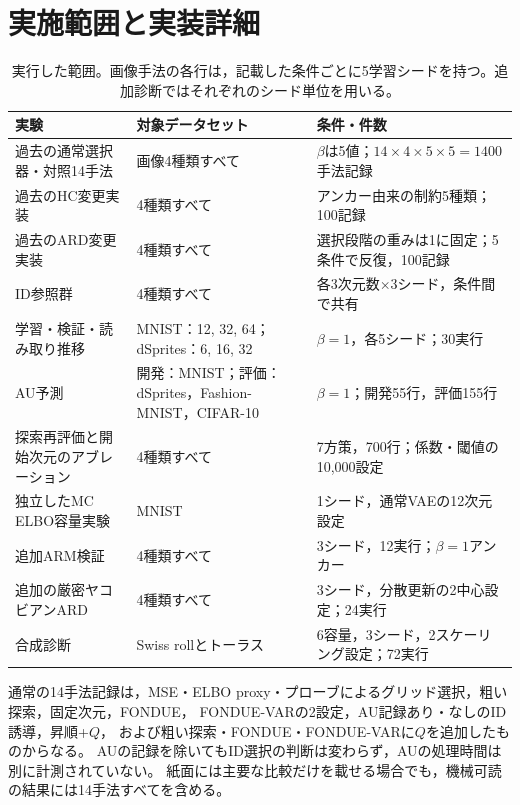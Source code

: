 \documentclass[11pt,a4paper]{ltjsarticle}
\begin{document}
\section{実施範囲と実装詳細}\label{app:coverage}
\begin{table}[H]
\caption{実行した範囲。画像手法の各行は，記載した条件ごとに5学習シードを持つ。追加診断ではそれぞれのシード単位を用いる。}
\label{tab:coverage}\small
\begin{tabularx}{\textwidth}{>{\raggedright\arraybackslash}p{}>{\raggedright\arraybackslash}p{}>{\raggedright\arraybackslash}X}\toprule
実験 & 対象データセット & 条件・件数 \\\midrule
過去の通常選択器・対照14手法 & 画像4種類すべて & $\beta$は5値；$14\times4\times5\times5=1400$手法記録 \\
過去のHC変更実装 & 4種類すべて & アンカー由来の制約5種類；100記録 \\
過去のARD変更実装 & 4種類すべて & 選択段階の重みは1に固定；5条件で反復，100記録 \\
ID参照群 & 4種類すべて & 各3次元数$\times$3シード，条件間で共有 \\
学習・検証・読み取り推移 & MNIST：12, 32, 64；dSprites：6, 16, 32 & $\beta=1$，各5シード；30実行 \\
AU予測 & 開発：MNIST；評価：dSprites，Fashion-MNIST，CIFAR-10 & $\beta=1$；開発55行，評価155行 \\
探索再評価と開始次元のアブレーション & 4種類すべて & 7方策，700行；係数・閾値の10,000設定 \\
独立したMC ELBO容量実験 & MNIST & 1シード，通常VAEの12次元設定 \\
追加ARM検証 & 4種類すべて & 3シード，12実行；$\beta=1$アンカー \\
追加の厳密ヤコビアンARD & 4種類すべて & 3シード，分散更新の2中心設定；24実行 \\
合成診断 & Swiss rollとトーラス & 6容量，3シード，2スケーリング設定；72実行 \\
\bottomrule\end{tabularx}
\end{table}

通常の14手法記録は，MSE・ELBO proxy・プローブによるグリッド選択，粗い探索，固定次元，FONDUE，
FONDUE-VARの2設定，AU記録あり・なしのID誘導，昇順+$Q$，
および粗い探索・FONDUE・FONDUE-VARに$Q$を追加したものからなる。
AUの記録を除いてもID選択の判断は変わらず，AUの処理時間は別に計測されていない。
紙面には主要な比較だけを載せる場合でも，機械可読の結果には14手法すべてを含める。
\end{document}
